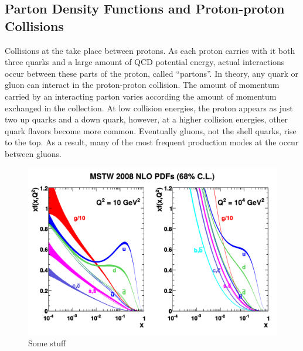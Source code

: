 \subsection{Parton Density Functions and Proton-proton Collisions}
Collisions at the \LHC take place between protons. As each proton carries with it both three quarks and a large amount of QCD potential energy, actual interactions occur between these parts of the proton, called ``partons''. In theory, any quark or gluon can interact in the proton-proton collision. The amount of momentum carried by an interacting parton varies according the amount of momentum exchanged in the collection. At low collision energies, the proton appears as just two up quarks and a down quark, however, at a higher collision energies, other quark flavors become more common.  Eventually gluons, not the shell quarks, rise to the top. As a result, many of the most frequent production modes at the \LHC occur between gluons.
\begin{figure}[!btp]
    \centering
    \includegraphics[width=\textwidth]{figures/mstw_pdfs.pdf}
    \caption[Proton PDFs at the \LHC]
       {Some stuff \cite{PDFExample}}
    \label{fig:proton_pdfs}
\end{figure}

